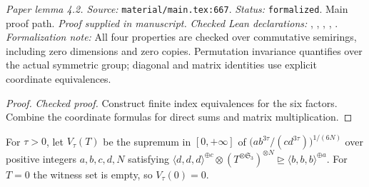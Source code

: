 \noindent\textit{Paper lemma 4.2. Source:} \texttt{material/main.tex:667}.
\textit{Status:} \texttt{formalized}. Main proof path.
\textit{Proof supplied in manuscript.}
\textit{Checked Lean declarations:} , , , , .
\textit{Formalization note:} All four properties are checked over commutative semirings, including zero dimensions and zero copies. Permutation invariance quantifies over the actual symmetric group; diagonal and matrix identities use explicit coordinate equivalences.

\begin{proof}
\leanok
{}
\textit{Checked proof.} Construct finite index equivalences for the six factors. Combine the coordinate formulas for direct sums and matrix multiplication.
\end{proof}

\renewcommand{\thetheorem}{4.3}
\begin{definition}
\label{def:fractional-value}
\leanok
{}
For $\tau>0$, let $V_\tau(T)$ be the supremum in $[0,+\infty]$ of $\bigl(ab^{3\tau}/(cd^{3\tau})\bigr)^{1/(6N)}$ over positive integers $a,b,c,d,N$ satisfying $\langle d,d,d\rangle^{\oplus c}\otimes(T^{\otimes\mathfrak S_3})^{\otimes N}\trianglerighteq\langle b,b,b\rangle^{\oplus a}$. For $T=0$ the witness set is empty, so $V_\tau(0)=0$.
\end{definition}

